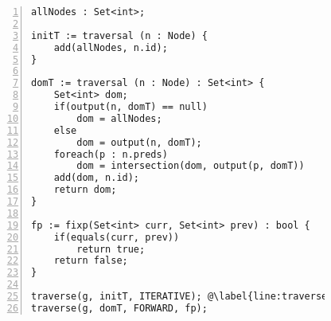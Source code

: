\begin{figure}[ht!]
\begin{lstlisting}[numbers=left, tabsize=4, escapechar=@, caption={Dominator analysis: an example program analysis expressed using our
system.},label={lst:dominators}] 
allNodes : Set<int>;

initT := traversal (n : Node) { 
	add(allNodes, n.id);
}

domT := traversal (n : Node) : Set<int> { 
	Set<int> dom;
	if(output(n, domT) == null)
		dom = allNodes;
	else
		dom = output(n, domT);
	foreach(p : n.preds) 
		dom = intersection(dom, output(p, domT)) 
	add(dom, n.id); 
	return dom; 
} 

fp := fixp(Set<int> curr, Set<int> prev) : bool {
	if(equals(curr, prev))
		return true;
	return false;
}

traverse(g, initT, ITERATIVE); @\label{line:traverse}@
traverse(g, domT, FORWARD, fp); 				
\end{lstlisting}
\end{figure}


